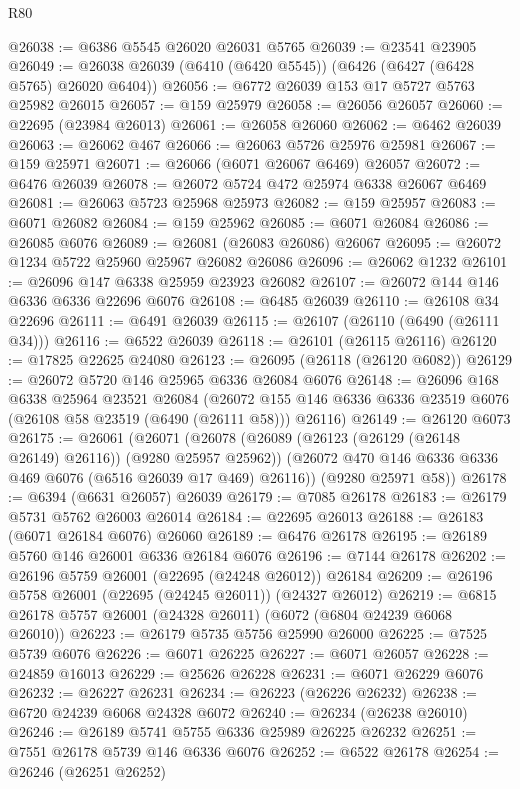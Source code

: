 \begin{lexlean}{R80}
\begin{coremodule}
@26038 := @6386 @5545 @26020 @26031 @5765
@26039 := @23541 @23905
@26049 := @26038 @26039 (@6410 (@6420 @5545)) (@6426 (@6427 (@6428 @5765) @26020 @6404))
@26056 := @6772 @26039 @153 @17 @5727 @5763 @25982 @26015
@26057 := @159 @25979
@26058 := @26056 @26057
@26060 := @22695 (@23984 @26013)
@26061 := @26058 @26060
@26062 := @6462 @26039
@26063 := @26062 @467
@26066 := @26063 @5726 @25976 @25981
@26067 := @159 @25971
@26071 := @26066 (@6071 @26067 @6469) @26057
@26072 := @6476 @26039
@26078 := @26072 @5724 @472 @25974 @6338 @26067 @6469
@26081 := @26063 @5723 @25968 @25973
@26082 := @159 @25957
@26083 := @6071 @26082
@26084 := @159 @25962
@26085 := @6071 @26084
@26086 := @26085 @6076
@26089 := @26081 (@26083 @26086) @26067
@26095 := @26072 @1234 @5722 @25960 @25967 @26082 @26086
@26096 := @26062 @1232
@26101 := @26096 @147 @6338 @25959 @23923 @26082
@26107 := @26072 @144 @146 @6336 @6336 @22696 @6076
@26108 := @6485 @26039
@26110 := @26108 @34 @22696
@26111 := @6491 @26039
@26115 := @26107 (@26110 (@6490 (@26111 @34)))
@26116 := @6522 @26039
@26118 := @26101 (@26115 @26116)
@26120 := @17825 @22625 @24080
@26123 := @26095 (@26118 (@26120 @6082))
@26129 := @26072 @5720 @146 @25965 @6336 @26084 @6076
@26148 := @26096
    @168
    @6338
    @25964
    @23521
    @26084
    (@26072 @155 @146 @6336 @6336 @23519 @6076 (@26108 @58 @23519 (@6490 (@26111 @58))) @26116)
@26149 := @26120 @6073
@26175 := @26061
    (@26071
      (@26078
        (@26089 (@26123 (@26129 (@26148 @26149) @26116)) (@9280 @25957 @25962))
        (@26072 @470 @146 @6336 @6336 @469 @6076 (@6516 @26039 @17 @469) @26116))
      (@9280 @25971 @58))
@26178 := @6394 (@6631 @26057) @26039
@26179 := @7085 @26178
@26183 := @26179 @5731 @5762 @26003 @26014
@26184 := @22695 @26013
@26188 := @26183 (@6071 @26184 @6076) @26060
@26189 := @6476 @26178
@26195 := @26189 @5760 @146 @26001 @6336 @26184 @6076
@26196 := @7144 @26178
@26202 := @26196 @5759 @26001 (@22695 (@24248 @26012)) @26184
@26209 := @26196 @5758 @26001 (@22695 (@24245 @26011)) (@24327 @26012)
@26219 := @6815 @26178 @5757 @26001 (@24328 @26011) (@6072 (@6804 @24239 @6068 @26010))
@26223 := @26179 @5735 @5756 @25990 @26000
@26225 := @7525 @5739 @6076
@26226 := @6071 @26225
@26227 := @6071 @26057
@26228 := @24859 @16013
@26229 := @25626 @26228
@26231 := @6071 @26229 @6076
@26232 := @26227 @26231
@26234 := @26223 (@26226 @26232)
@26238 := @6720 @24239 @6068 @24328 @6072
@26240 := @26234 (@26238 @26010)
@26246 := @26189 @5741 @5755 @6336 @25989 @26225 @26232
@26251 := @7551 @26178 @5739 @146 @6336 @6076
@26252 := @6522 @26178
@26254 := @26246 (@26251 @26252)

\end{coremodule}
\end{lexlean}
